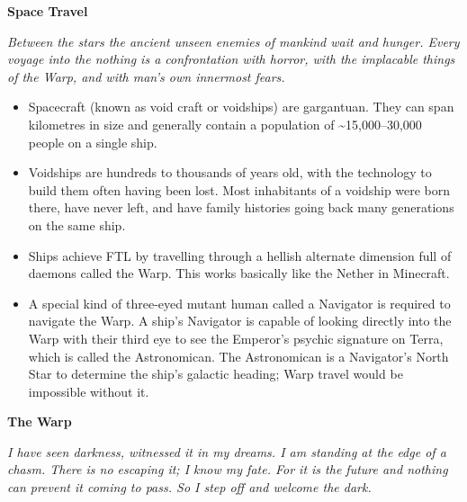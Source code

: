 \documentclass[10pt,a4paper]{article}
\newcommand{\rpgsection}[1]{%
  \vspace{0.8em}%
  {\headerfont\bfseries\Large #1}\par%
  \vspace{0.5em}%
}
\begin{document}
\begin{multicols}{2}
\rpgsection{Space Travel}
\textit{Between the stars the ancient unseen enemies of mankind wait and hunger. Every voyage into the nothing is a confrontation with horror, with the implacable things of the Warp, and with man's own innermost fears.}

\begin{itemize}
  \item Spacecraft (known as void craft or voidships) are gargantuan. They can span kilometres in size and generally contain a population of \textasciitilde15,000–30,000 people on a single ship.
  \item Voidships are hundreds to thousands of years old, with the technology to build them often having been lost. Most inhabitants of a voidship were born there, have never left, and have family histories going back many generations on the same ship.
  \item Ships achieve FTL by travelling through a hellish alternate dimension full of daemons called the Warp. This works basically like the Nether in Minecraft.
  \item A special kind of three-eyed mutant human called a Navigator is required to navigate the Warp. A ship’s Navigator is capable of looking directly into the Warp with their third eye to see the Emperor’s psychic signature on Terra, which is called the Astronomican. The Astronomican is a Navigator's North Star to determine the ship’s galactic heading; Warp travel would be impossible without it.
\end{itemize}

\rpgsection{The Warp}
\textit{I have seen darkness, witnessed it in my dreams. I am standing at the edge of a chasm. There is no escaping it; I know my fate. For it is the future and nothing can prevent it coming to pass. So I step off and welcome the dark.}


\end{multicols}
\end{document}
